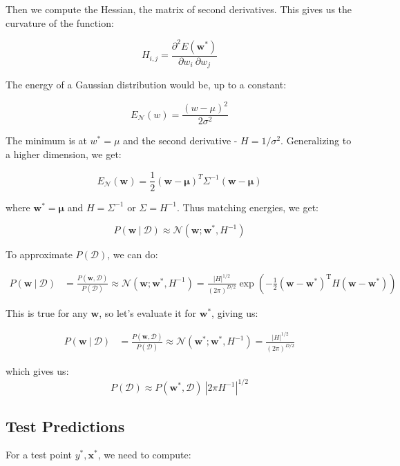 \documentclass{article}
\newcommand{\vf}[1]{\mathbf{#1}}
\newcommand{\normal}{\mathcal{N}}
\newcommand{\bx}{\vf{x}}
\newcommand{\bw}{\vf{w}}
\newcommand{\giv}{\ |\ }
\newcommand{\gauss}{\mathcal{N}}
\newcommand{\data}{\mathcal{D}}
\begin{document}
Then we compute the Hessian, the matrix of second derivatives. This gives us the curvature of the function:

\begin{equation*}
    H_{i, j} = \frac{
        \partial^2 E(\bw^*) 
    }{
        \partial w_i\ \partial w_j
    }
\end{equation*}

The energy of a Gaussian distribution would be, up to a constant:

\begin{equation*}
    E_\gauss (w) = \frac{(w - \mu)^2}{2\sigma^2}
\end{equation*}

The minimum is at $w^* = \mu$ and the second derivative - $H = 1 / \sigma^2$. Generalizing to a higher dimension, we get:

\begin{equation*}
    E_\normal(\bw) = \frac{1}{2} (\bw - \mathbf{\mu})^T \Sigma^{-1} (\bw - \mathbf{\mu})
\end{equation*}

where $\bw^* = \mathbf{\mu}$ and $H = \Sigma^{-1}$ or $\Sigma = H^{-1}$. Thus matching energies, we get:

\begin{equation*}
    P(\bw \giv \data) \approx \normal(\bw; \bw^*, H^{-1})
\end{equation*}

To approximate $P(\data)$, we can do:

\begin{align*}
    P(\bw \giv \data) &= \frac{P(\bw, \data)}{P(\data)}
        \approx \normal(\bw; \bw^*, H^{-1}) =
        \frac{|H|^{1/2}}{(2\pi)^{D/2}} \exp(-\frac{1}{2}
            (\bw - \bw^*)^{\text{T}} H (\bw - \bw^*)) 
\end{align*}

This is true for any $\bw$, so let's evaluate it for $\bw^*$, giving us:

\begin{align*}
    P(\bw \giv \data) &= \frac{P(\bw, \data)}{P(\data)}
        \approx \normal(\bw^*; \bw^*, H^{-1}) =
        \frac{|H|^{1/2}}{(2\pi)^{D/2}}
\end{align*}

which gives us:
\begin{equation*}
    P(\data) \approx P(\bw^*, \data)\ |2 \pi H^{-1}|^{1/2}
\end{equation*}

\subsection{Test Predictions}
For a test point $y^*, \bx^*$, we need to compute:
\end{document}
